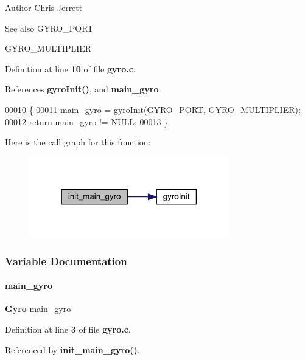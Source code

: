 \begin{DoxyAuthor}{Author}
Chris Jerrett 
\end{DoxyAuthor}
\begin{DoxySeeAlso}{See also}
G\+Y\+R\+O\+\_\+\+P\+O\+RT 

G\+Y\+R\+O\+\_\+\+M\+U\+L\+T\+I\+P\+L\+I\+ER 
\end{DoxySeeAlso}


Definition at line \textbf{ 10} of file \textbf{ gyro.\+c}.



References \textbf{ gyro\+Init()}, and \textbf{ main\+\_\+gyro}.


\begin{DoxyCode}
00010                       \{
00011   main_gyro = gyroInit(GYRO\_PORT, GYRO\_MULTIPLIER);
00012   \textcolor{keywordflow}{return} main_gyro != NULL;
00013 \}
\end{DoxyCode}
Here is the call graph for this function\+:
\nopagebreak
\begin{figure}[H]
\begin{center}
\leavevmode
\includegraphics[width=246pt]{gyro_8c_a47c0a78a867be91a28e278bf433d699c_cgraph}
\end{center}
\end{figure}


\subsubsection{Variable Documentation}
\mbox{\label{gyro_8c_ab848a00cddfc20556aef426cf11f9a85}} 
\paragraph{main\+\_\+gyro}
{\footnotesize\ttfamily \textbf{ Gyro} main\+\_\+gyro\hspace{0.3cm}{\ttfamily [static]}}



Definition at line \textbf{ 3} of file \textbf{ gyro.\+c}.



Referenced by \textbf{ init\+\_\+main\+\_\+gyro()}.


